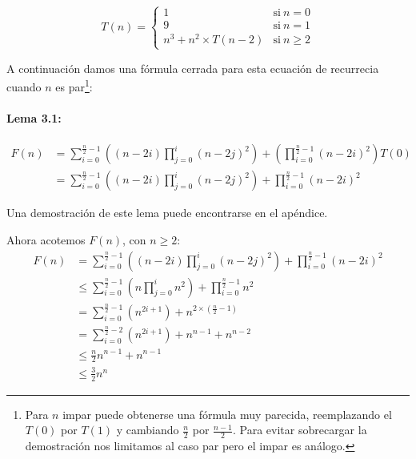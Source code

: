 \begin{equation}
 \label{eq:aqui-le-mostramos-como-hacerle-la-llave-grande}
 T(n) = \left\{
     \begin{array}{ll}
 1      & \mathrm{si\ } n = 0 \\
 9      & \mathrm{si\ } n = 1 \\
 n^3 + n^2\times T(n-2)     & \mathrm{si\ } n \geq 2
     \end{array}
   \right.
\end{equation}

A continuación damos una fórmula cerrada para esta ecuación de recurrecia cuando $n$ es par\footnote{Para $n$ impar puede obtenerse una fórmula muy parecida, reemplazando el $T(0)$ por $T(1)$ y cambiando $\frac{n}{2}$ por $\frac{n-1}{2}$. Para evitar sobrecargar la demostración nos limitamos al caso par pero el impar es análogo.}:

\paragraph{Lema 3.1:} 
\begin{equation}
\begin{aligned}
  F(n) &= \sum_{i=0}^{\frac{n}{2}-1} \left((n-2i) \prod_{j=0}^{i}(n-2j)^2\right) + \left(\prod_{i=0}^{\frac{n}{2}-1}(n-2i)^2\right) T(0)\\
  &= \sum_{i=0}^{\frac{n}{2}-1} \left((n-2i) \prod_{j=0}^{i}(n-2j)^2\right) + \prod_{i=0}^{\frac{n}{2}-1}(n-2i)^2
\end{aligned}
\end{equation}

Una demostración de este lema puede encontrarse en el apéndice.

  Ahora acotemos $F(n)$, con $n \geq 2$:
  \begin{equation}
  \begin{aligned}
  F(n) &= \sum_{i=0}^{\frac{n}{2}-1} \left((n-2i) \prod_{j=0}^{i}(n-2j)^2\right) + \prod_{i=0}^{\frac{n}{2}-1}(n-2i)^2 \\
  &\leq \sum_{i=0}^{\frac{n}{2}-1} \left(n \prod_{j=0}^{i}n^2\right) + \prod_{i=0}^{\frac{n}{2}-1}n^2 \\
  &= \sum_{i=0}^{\frac{n}{2}-1} (n^{2i+1}) + n^{2\times(\frac{n}{2}-1)} \\
  &= \sum_{i=0}^{\frac{n}{2}-2} (n^{2i+1}) + n^{n-1} + n^{n-2} \\
  &\leq \frac{n}{2} n^{n-1} + n^{n-1}\\
  &\leq \frac{3}{2} n^{n}
  \end{aligned}
  \end{equation}

